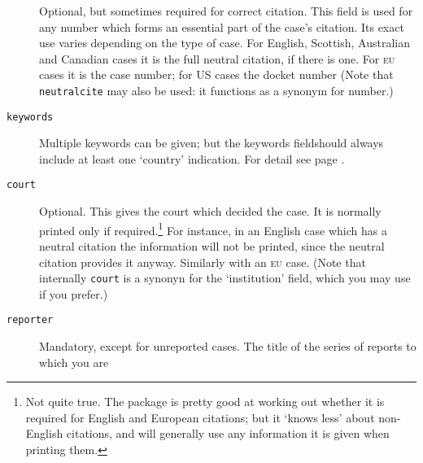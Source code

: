 \documentclass[a4paper,
               11pt,
	       DIV=1,			   
	       footinclude=false]
	      {scrartcl}
\begin{document}
\begin{description}
Optional, but sometimes required for correct
  citation. This field is used for any number which forms an essential
  part of the case's citation. Its exact use varies depending on the
  type of case. For English, Scottish, Australian and Canadian cases it is the full neutral
  citation, if there is one. For \textsc{eu} cases it is the case
  number; for US cases the docket number (Note that \texttt{neutralcite} may also be used: it
  functions as a synonym for number.)
\item[\texttt{keywords}]
Multiple keywords can be given; but the
keywords field\linebreak should always include at least one `country'
indication. For detail see page \pageref{countries}.
\item[\texttt{court}]
Optional. This gives the court which decided the
  case. It is normally printed only if required.\footnote{Not quite
    true. The package is pretty good at working out whether it is
    required for English and European citations; but it `knows less'
    about non-English citations, and will generally use any
    information it is given when printing them.} For instance, in an
  English case which has a neutral citation the information will not
  be printed, since the neutral citation provides it anyway. Similarly
  with an \textsc{eu} case. (Note that internally \texttt{court} is a
  synonyn for the `institution' field, which you may use if you
  prefer.)
\item[\texttt{reporter}]
Mandatory, except for unreported
  cases. The title of the series of reports to which you are

\end{description}
\end{document}

